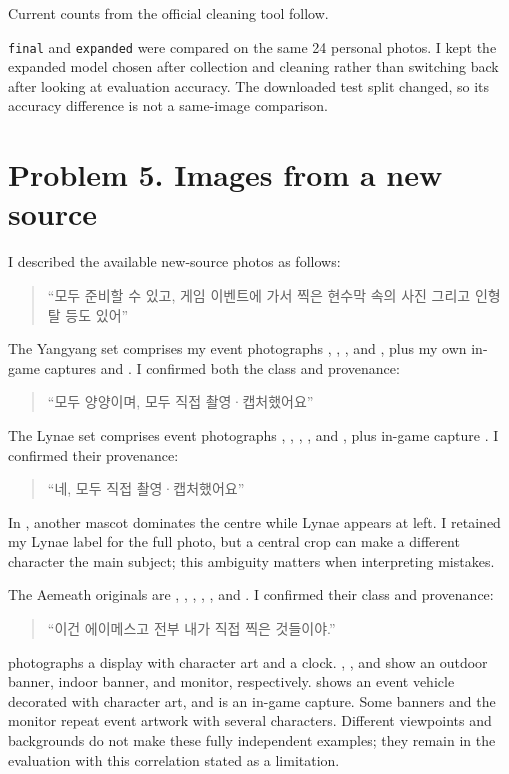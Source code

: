 \documentclass[11pt]{article}
\begin{document}
Current counts from the official cleaning tool follow.

\texttt{final} and \texttt{expanded} were compared on the same 24 personal photos. I kept the expanded model chosen after collection and cleaning rather than switching back after looking at evaluation accuracy. The downloaded test split changed, so its accuracy difference is not a same-image comparison.

\section*{Problem 5. Images from a new source}

\begingroup\raggedright
I described the available new-source photos as follows:
\begin{quote}
``모두 준비할 수 있고, 게임 이벤트에 가서 찍은 현수막 속의 사진 그리고 인형 탈 등도 있어''
\end{quote}

The Yangyang set comprises my event photographs , , , and , plus my own in-game captures  and . I confirmed both the class and provenance:
\begin{quote}
``모두 양양이며, 모두 직접 촬영·캡처했어요''
\end{quote}

The Lynae set comprises event photographs , , , , and , plus in-game capture . I confirmed their provenance:
\begin{quote}
``네, 모두 직접 촬영·캡처했어요''
\end{quote}
In , another mascot dominates the centre while Lynae appears at left. I retained my Lynae label for the full photo, but a central crop can make a different character the main subject; this ambiguity matters when interpreting mistakes.

The Aemeath originals are , , , , , and . I confirmed their class and provenance:
\begin{quote}
``이건 에이메스고 전부 내가 직접 찍은 것들이야.''
\end{quote}
 photographs a display with character art and a clock. , , and  show an outdoor banner, indoor banner, and monitor, respectively.  shows an event vehicle decorated with character art, and  is an in-game capture. Some banners and the monitor repeat event artwork with several characters. Different viewpoints and backgrounds do not make these fully independent examples; they remain in the evaluation with this correlation stated as a limitation.
\end{document}
